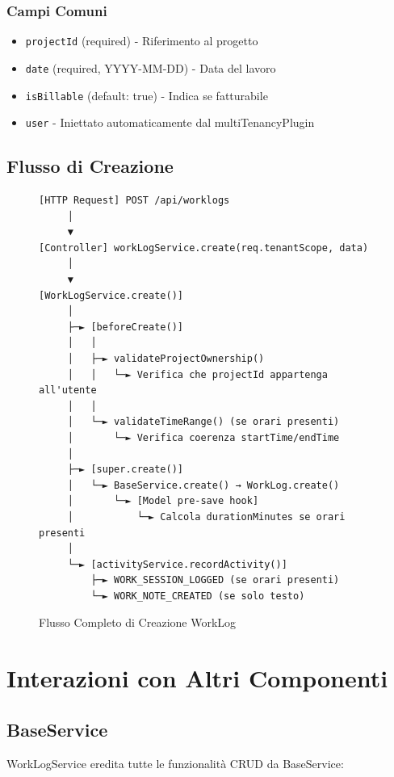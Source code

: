 \documentclass[11pt,a4paper]{article}
\begin{document}
\subsubsection{Campi Comuni}
\begin{itemize}
    \item \texttt{projectId} (required) - Riferimento al progetto
    \item \texttt{date} (required, YYYY-MM-DD) - Data del lavoro
    \item \texttt{isBillable} (default: true) - Indica se fatturabile
    \item \texttt{user} - Iniettato automaticamente dal multiTenancyPlugin
\end{itemize}

\subsection{Flusso di Creazione}

\begin{figure}[H]
\centering
\begin{lstlisting}[caption=Flusso Creazione WorkLog]
[HTTP Request] POST /api/worklogs
     │
     ▼
[Controller] workLogService.create(req.tenantScope, data)
     │
     ▼
[WorkLogService.create()]
     │
     ├─► [beforeCreate()]
     │   │
     │   ├─► validateProjectOwnership()
     │   │   └─► Verifica che projectId appartenga all'utente
     │   │
     │   └─► validateTimeRange() (se orari presenti)
     │       └─► Verifica coerenza startTime/endTime
     │
     ├─► [super.create()]
     │   └─► BaseService.create() → WorkLog.create()
     │       └─► [Model pre-save hook]
     │           └─► Calcola durationMinutes se orari presenti
     │
     └─► [activityService.recordActivity()]
         ├─► WORK_SESSION_LOGGED (se orari presenti)
         └─► WORK_NOTE_CREATED (se solo testo)
\end{lstlisting}
\caption{Flusso Completo di Creazione WorkLog}
\end{figure}

\section{Interazioni con Altri Componenti}

\subsection{BaseService}

WorkLogService eredita tutte le funzionalità CRUD da BaseService:
\end{document}
